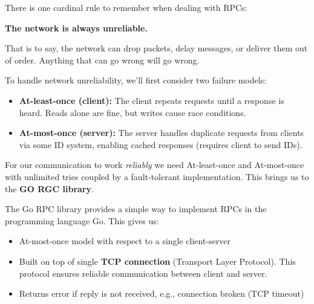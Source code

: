 \noindent
There is one cardinal rule to remember when dealing with RPCs:
\begin{theo}

    \begin{center}
        \Large{\textbf{The network is always unreliable.}}
    \end{center}

    \vspace{1em}

    \noindent
    That is to say, the network can drop packets, delay messages, or deliver them out of order. Anything that 
    can go wrong will go wrong.
\end{theo}

\noindent
To handle network unreliability, we'll first consider two failure models:

\begin{Def}

    \begin{itemize}
        \item \textbf{At-least-once (client):} The client repeats requests until a response is heard. 
        Reads alone are fine, but writes cause race conditions.
        \item \textbf{At-most-once (server):} The server handles duplicate requests from clients via
        some ID system, enabling cached responses (requires client to send IDs).
    \end{itemize}
\end{Def}

\newpage

\noindent
For our communication to work \textit{reliably} we need At-least-once and At-most-once with unlimited tries coupled by 
a fault-tolerant implementation. This brings us to the \textbf{GO RGC library}.

\begin{Def}

    The Go RPC library provides a simple way to implement RPCs in the programming language Go. This gives us:
    \begin{itemize}
        \item At-most-once model with respect to a single
        client-server
        \item Built on top of single \textbf{TCP connection} (Transport Layer Protocol). This protocol ensures reliable communication between client and server.
        \item Returns error if reply is not received, e.g.,
        connection broken (TCP timeout)
    \end{itemize}
\end{Def}

